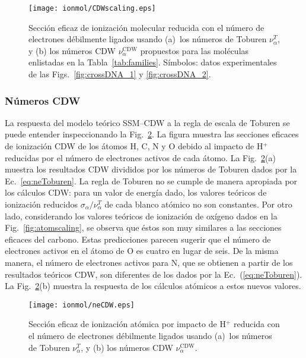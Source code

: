\begin{figure}[t]
\centering
\texttt{[image: ionmol/CDWscaling.eps]}
\caption[Sección eficaz de ionización molecular reducida por $n_e$.]
{Sección eficaz de ionización molecular reducida con el número de 
electrones débilmente ligados usando 
(a)~los números de Toburen $\nu_{\alpha}^T$, y 
(b) los números CDW $\nu_{\alpha}^{\text{CDW}}$ propuestos para las 
moléculas enlistadas en la Tabla~\ref{tab:families}. 
Símbolos: datos experimentales de las Figs.~\ref{fig:crossDNA_1} y 
\ref{fig:crossDNA_2}.}
\label{fig:newscaling}
\end{figure}

\subsubsection{Números CDW}
\label{subsec:CDW}

La respuesta del modelo teórico SSM--CDW a la regla de escala de Toburen 
se puede entender inspeccionando la Fig.~\ref{fig:neCDW}. La figura 
muestra las secciones eficaces de ionización CDW de los átomos H, C, N y 
O debido al impacto de H$^+$ reducidas por el número de electrones 
activos de cada átomo. La Fig.~\ref{fig:neCDW}(a) muestra los resultados 
CDW divididos por los números de Toburen dados por la 
Ec.~\ref{eq:neToburen}. La regla de Toburen no se cumple de manera 
apropiada por los cálculos CDW: para un valor de energía dado, los 
valores teóricos de ionización reducidos 
$\sigma_{\alpha}/\nu_{\alpha}^T$ de cada blanco atómico no son 
constantes. Por otro lado, considerando los valores teóricos de 
ionización de oxígeno dados en la Fig.~\ref{fig:atomscaling}, se observa 
que éstos son muy similares a las secciones eficaces del carbono. Estas 
predicciones parecen sugerir que el número de electrones activos en el 
átomo de O es cuatro en lugar de seis. De la misma manera, el número de 
electrones activos para N, que se obtienen a partir de los resultados 
teóricos CDW, son diferentes de los dados por la 
Ec.~(\ref{eq:neToburen}). La Fig.~\ref{fig:neCDW}(b) muestra la 
respuesta de los cálculos atómicos a estos nuevos valores.

\begin{figure}[t]
\centering
\texttt{[image: ionmol/neCDW.eps]}
\caption[Sección eficaz de ionización atómica reducida por $n_e$.]
{Sección eficaz de ionización atómica por impacto de H$^+$ reducida con 
el número de electrones débilmente ligados usando 
(a)~los números de Toburen $\nu_{\alpha}^T$, y 
(b) los números CDW $\nu_{\alpha}^{\text{CDW}}$.}
\label{fig:neCDW}
\end{figure}

